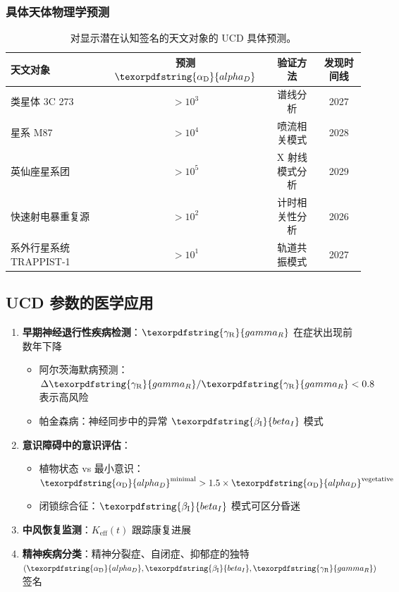 \documentclass[11pt,a4paper]{article}
\DeclareRobustCommand{\alD}{\texorpdfstring{\ensuremath{\alpha_{\mathrm{D}}}}{alpha_D}}
\DeclareRobustCommand{\beI}{\texorpdfstring{\ensuremath{\beta_{\mathrm{I}}}}{beta_I}}
\DeclareRobustCommand{\gaR}{\texorpdfstring{\ensuremath{\gamma_{\mathrm{R}}}}{gamma_R}}
\newcommand{\eff}{\mathrm{eff}}
\newcommand{\Ke}{K_{\eff}}
\begin{document}
	\subsubsection{具体天体物理学预测}
	
	\begin{table}[ht]
		\centering
		\scriptsize
		\begin{tabular}{lccc}
			\toprule
			\textbf{天文对象} & \textbf{预测 \(\alD\)} & \textbf{验证方法} & \textbf{发现时间线} \\
			\midrule
			类星体 3C 273 & \(>10^3\) & 谱线分析 & 2027 \\
			星系 M87 & \(>10^4\) & 喷流相关模式 & 2028 \\
			英仙座星系团 & \(>10^5\) & X 射线模式分析 & 2029 \\
			快速射电暴重复源 & \(>10^2\) & 计时相关性分析 & 2026 \\
			系外行星系统 TRAPPIST-1 & \(>10^1\) & 轨道共振模式 & 2027 \\
			\bottomrule
		\end{tabular}
		\caption{对显示潜在认知签名的天文对象的 UCD 具体预测。}
		\label{tab:astro-predictions}
	\end{table}
	
	\subsection{UCD 参数的医学应用}
	
	\begin{enumerate}
		\item \textbf{早期神经退行性疾病检测}：\(\gaR\) 在症状出现前数年下降
		\begin{itemize}
			\item 阿尔茨海默病预测：\(\Delta\gaR/\gaR < 0.8\) 表示高风险
			\item 帕金森病：神经同步中的异常 \(\beI\) 模式
		\end{itemize}
		
		\item \textbf{意识障碍中的意识评估}：
		\begin{itemize}
			\item 植物状态 vs 最小意识：\(\alD^{\mathrm{minimal}} > 1.5 \times \alD^{\mathrm{vegetative}}\)
			\item 闭锁综合征：\(\beI\) 模式可区分昏迷
		\end{itemize}
		
		\item \textbf{中风恢复监测}：\(\Ke(t)\) 跟踪康复进展
		\item \textbf{精神疾病分类}：精神分裂症、自闭症、抑郁症的独特 \((\alD, \beI, \gaR)\) 签名
	\end{enumerate}
	
\end{document}
